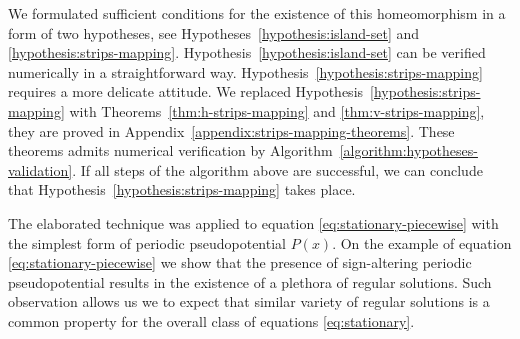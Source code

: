 We formulated sufficient conditions for the existence of this	 homeomorphism in a form of two hypotheses, see Hypotheses~\ref{hypothesis:island-set} and \ref{hypothesis:strips-mapping}.
Hypothesis~\ref{hypothesis:island-set} can be verified numerically in a straightforward way.
Hypothesis~\ref{hypothesis:strips-mapping} requires a more delicate attitude.
We replaced Hypothesis~\ref{hypothesis:strips-mapping} with Theorems~\ref{thm:h-strips-mapping} and \ref{thm:v-strips-mapping}, they are proved in Appendix~\ref{appendix:strips-mapping-theorems}.
These theorems admits numerical verification by Algorithm~\ref{algorithm:hypotheses-validation}.
If all steps of the algorithm above are successful, we can conclude that Hypothesis~\ref{hypothesis:strips-mapping} takes place. 

The elaborated technique was applied to equation \eqref{eq:stationary-piecewise} with the simplest form of periodic pseudopotential $P(x)$.
On the example of equation \eqref{eq:stationary-piecewise} we show that the presence of sign-altering periodic pseudopotential results in the existence of a plethora of regular solutions.
Such observation allows us we to expect that similar variety of regular solutions is a common property for the overall class of equations \eqref{eq:stationary}.
